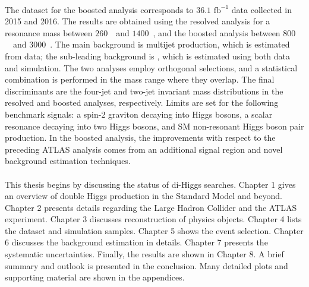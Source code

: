 \paragraph{}
The dataset for the boosted analysis corresponds to $36.1$ $\mathrm{fb}^{-1}$ data collected in 2015 and 2016. 
The results are obtained using the resolved analysis for a resonance mass between $260$~\GeV\ and $1400$~\GeV, and the boosted analysis between $800$~\GeV\ and $3000$~\GeV. 
The main background is multijet production, which is estimated from data; the sub-leading background is \ttbar, which is estimated using both data and simulation. 
The two analyses employ orthogonal selections, and a statistical combination is performed in the mass range where they overlap.
The final discriminants are the four-jet and two-jet invariant mass distributions in the resolved and boosted analyses, respectively. 
Limits are set for the following benchmark signals: a spin-2 graviton decaying into Higgs bosons, a scalar resonance decaying into two Higgs bosons, and SM non-resonant Higgs boson pair production.
In the boosted analysis, the improvements with respect to the preceding ATLAS analysis comes from an additional signal region and novel background estimation techniques. 

\paragraph{}
This thesis begins by discussing the status of di-Higgs searches. 
Chapter 1 gives an overview of double Higgs production in the Standard Model and beyond. 
Chapter 2 presents details regarding the Large Hadron Collider and the ATLAS experiment. 
Chapter 3 discusses reconstruction of physics objects. 
Chapter 4 lists the dataset and simulation samples. 
Chapter 5 shows the event selection.
Chapter 6 discusses the background estimation in details.
Chapter 7 presents the systematic uncertainties.
Finally, the results are shown in Chapter 8.
A brief summary and outlook is presented in the conclusion.
Many detailed plots and supporting material are shown in the appendices.


